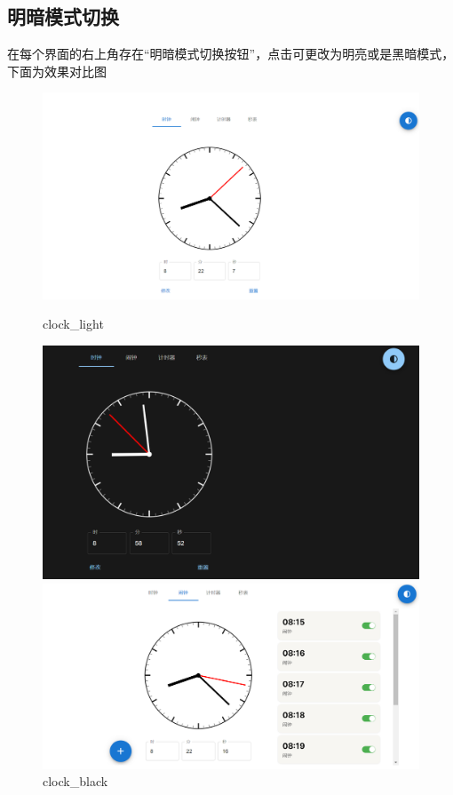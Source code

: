 \documentclass[a4paper,11pt]{article}
\begin{document}
\subsection{明暗模式切换}
在每个界面的右上角存在“明暗模式切换按钮”，点击可更改为明亮或是黑暗模式，下面为效果对比图

\begin{figure}[!h]
    \centering
    \begin{minipage}{0.48\textwidth}
        \centering
        \includegraphics[width=\linewidth]{image/clock.png}
        \caption{clock\_light}
    \end{minipage}\hfill
    \begin{minipage}{0.48\textwidth}
        \centering
        \includegraphics[width=\linewidth]{image/clock_black.png}
        \caption{clock\_black}
    \end{minipage}\hfill
    \begin{minipage}{0.48\textwidth}
        \centering
        \includegraphics[width=\linewidth]{image/alarm.png}

\end{minipage}
\end{figure}
\end{document}
